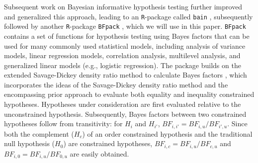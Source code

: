 \documentclass[11pt,reqno]{article}
\begin{document}
Subsequent work on Bayesian informative hypothesis testing further improved and generalized this approach, leading to an \texttt{R}-package called \texttt{bain} \citep{bain}, subsequently followed by another \texttt{R}-package \texttt{BFpack} \citep{BFpack}, which we will use in this paper.
\texttt{BFpack} contains a set of functions for hypothesis testing using Bayes factors that can be used for many commonly used statistical models, including analysis of variance models, linear regression models, correlation analysis, multilevel analysis, and generalized linear models (e.g., logistic regression).
The package builds on the extended Savage-Dickey density ratio method to calculate Bayes factors \citep{mulder_generalization_2022}, which incorporates the ideas of the Savage-Dickey density ratio method \citep[e.g., see][]{wagenmakers_bayesian_2010} and the encompassing prior approach \citep[][]{klugkist_inequality_2005} to evaluate both equality and inequality constrained hypotheses.
Hypotheses under consideration are first evaluated relative to the unconstrained hypothesis.
Subsequently, Bayes factors between two constrained hypotheses follow from transitivity: for $H_{i}$ and $H_{i'}$, $BF_{i,i'}=BF_{i,u}/BF_{i',u}$.
Since both the complement ($H_c$) of an order constrained hypothesis and the traditional null hypothesis ($H_0$) are constrained hypotheses, $BF_{i,c}=BF_{i,u}/BF_{c,u}$ and $BF_{i,0}=BF_{i,u}/BF_{0,u}$ are easily obtained.
\end{document}
